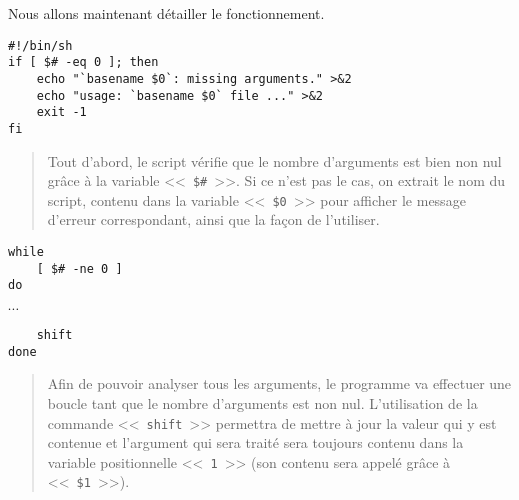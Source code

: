 Nous allons maintenant d{\'e}tailler le fonctionnement.

\begin{verbatim}
#!/bin/sh
if [ $# -eq 0 ]; then
    echo "`basename $0`: missing arguments." >&2
    echo "usage: `basename $0` file ..." >&2
    exit -1
fi
\end{verbatim}
\begin{quote}

Tout d'abord, le script v{\'e}rifie que le nombre d'arguments est bien non nul gr{\^a}ce
{\`a} la variable <<~\verb,$#,~>>. Si ce n'est pas le cas, on extrait le nom du
script, contenu dans la variable <<~\verb,$0,~>> pour afficher le message d'erreur
correspondant, ainsi que la fa\c{c}on de l'utiliser.
\end{quote}

\begin{verbatim}
while
    [ $# -ne 0 ]
do
\end{verbatim}
\vspace{2ex}
$\cdots$
\\[2ex]
\begin{verbatim}
    shift
done
\end{verbatim}
\begin{quote}
Afin de pouvoir analyser tous les arguments, le programme va effectuer une boucle
tant que le nombre d'arguments est non nul. L'utilisation de la commande <<~{\tt shift}~>>
permettra de mettre {\`a} jour la valeur qui y est contenue et l'argument qui sera trait{\'e} sera
toujours contenu dans la variable positionnelle <<~{\tt 1}~>> (son contenu sera appel{\'e} gr{\^a}ce
{\`a} <<~\verb=$1=~>>).
\end{quote}

